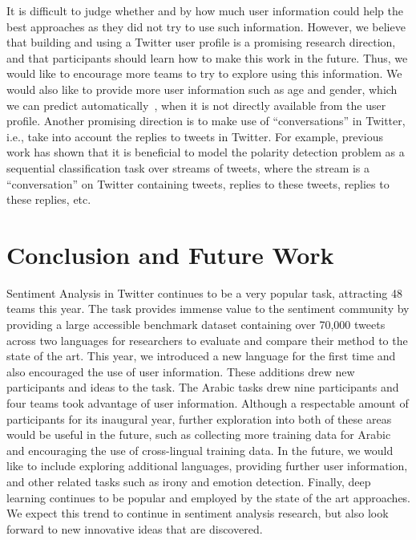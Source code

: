 \documentclass[11pt,a4paper]{article}
\begin{document}
\noindent It is difficult to judge whether and by how much user information could help the best approaches as they did not try to use such information.
However, we believe that building and using a Twitter user profile is a promising research direction, and that participants should learn how to make this work in the future. Thus, we would like to encourage more teams to try to explore using this information. 
We would also like to provide more user information such as age and gender, which we can predict automatically~\cite{rosenthal2016social}, when it is not directly available from the user profile.  
Another promising direction is to make use of ``conversations'' in Twitter, i.e., take into account the replies to tweets in Twitter.
For example, previous work \cite{vanzo-croce-basili:2014:Coling} has shown that it is beneficial to model the polarity detection problem as a sequential classification task over streams of tweets, where the stream is a ``conversation'' on Twitter containing tweets, replies to these tweets, replies to these replies, etc.

\section{Conclusion and Future Work}
\label{sec:conclusion}

Sentiment Analysis in Twitter continues to be a very popular task, attracting 48 teams this year. The task provides immense value to the sentiment community by providing a large accessible benchmark dataset containing over 70,000 tweets across two languages for researchers to evaluate and compare their method to the state of the art. This year, we introduced a new language for the first time and also encouraged the use of user information. These additions drew new participants and ideas to the task. The Arabic tasks drew nine participants and four teams took advantage of user information. Although a respectable amount of participants for its inaugural year, further exploration into both of these areas would be useful in the future, such as collecting more training data for Arabic and encouraging the use of cross-lingual training data. In the future, we would like to include exploring additional languages, providing further user information, and other related tasks such as irony and emotion detection. Finally, deep learning continues to be popular and employed by the state of the art approaches. We expect this trend to continue in sentiment analysis research, but also look forward to new innovative ideas that are discovered. 
\end{document}
